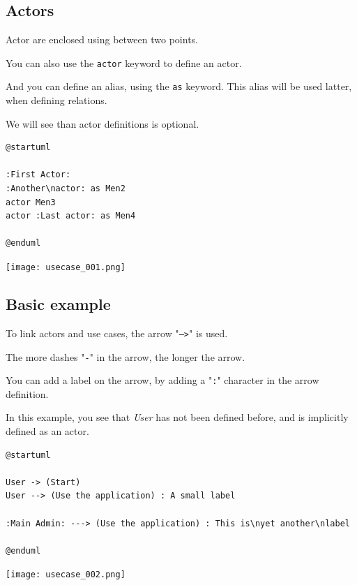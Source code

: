 \newpage \subsection{Actors}

\begin{description}
\item Actor are enclosed using between two points.
\item You can also use the \texttt{actor} keyword to define an actor.
\item And you can define an alias, using the \texttt{as} keyword. This alias will be used latter, when defining relations.
\item We will see than actor definitions is optional.
\end{description}


\begin{lstlisting}
@startuml

:First Actor:
:Another\nactor: as Men2  
actor Men3
actor :Last actor: as Men4

@enduml
\end{lstlisting}
\begin{center}
\texttt{[image: usecase\_001.png]}
\end{center}


\newpage \subsection{Basic example}

\begin{description}
\item To link actors and use cases, the arrow "\texttt{-->}" is used.
\item The more dashes "\texttt{-}" in the arrow, the longer the arrow. 
\item You can add a label on the arrow, by adding a "\texttt{:}" character in
the arrow definition.
\item In this example, you see that \textit{User} has not been defined before,
and is implicitly defined as an actor.
\end{description}

\begin{lstlisting}
@startuml

User -> (Start)
User --> (Use the application) : A small label

:Main Admin: ---> (Use the application) : This is\nyet another\nlabel

@enduml
\end{lstlisting}
\begin{center}
\texttt{[image: usecase\_002.png]}
\end{center}


